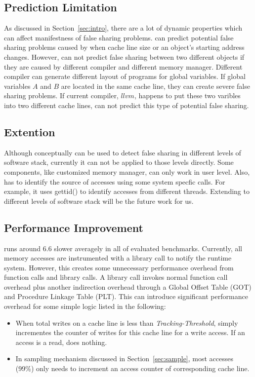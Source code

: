 \label{sec:discussion}

\subsection{Prediction Limitation}
As discussed in Section~\ref{sec:intro}, there are a lot of dynamic properties
which can affect manifestness of false sharing problems. 
 can predict potential false sharing problems caused by when cache line size
or an object's starting address changes.
However,  can not predict false sharing between two different objects
if they are caused by different compiler and different memory manager. 
Different compiler can generate different layout of programs for global variables. 
If global variables $A$ and $B$ are located in the same cache line, they can create severe false 
sharing problems. 
If current compiler, $llvm$, happens to put these two varibles into two different cache lines, 
 can not predict this type of potential false sharing. 

\subsection{Extention}
Although  conceptually can be used to detect false sharing in different levels of 
software stack, currently it can not be applied to those levels directly. 
Some components, like customized memory manager, can only work in user level. Also, 
has to identify the source of accesses using some system specfic calls. For example, it uses
gettid() to identify accesses from different threads.   
Extending  to different levels of software stack will be the future work for us.

\subsection{Performance Improvement}
 runs around $6.6$ slower averagely in all of evaluated benchmarks. 
Currently, all memory accesses are instrumented with a library call to notify the runtime system. 
However, this creates some unnecessary performance overhead from function calls and library calls. 
A library call invokes normal function call overhead plus another indirection overhead through 
a Global Offset Table (GOT) and Procedure Linkage Table (PLT).
This can introduce significant performance overhead for some simple logic listed in the following:
\begin{itemize}
\item
When total writes on a cache line is less than {\it Tracking-Threshold}, 
 simply incrementes the counter of writes for this cache line for a write access. 
If an access is a read,  does nothing. 
\item
In sampling mechanism discussed in Section~\ref{sec:sample}, 
most accesses (99\%) only needs to increment an access counter of corresponding cache line.
\end{itemize}

